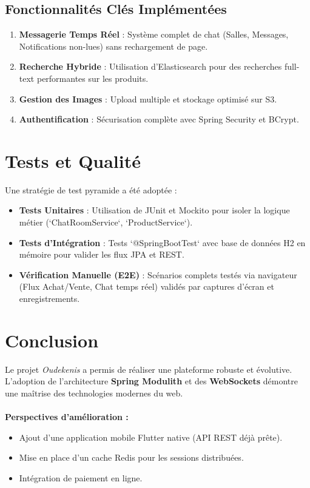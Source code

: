 \documentclass[12pt,a4paper]{article}
\begin{document}
\subsection{Fonctionnalités Clés Implémentées}
\begin{enumerate}
    \item \textbf{Messagerie Temps Réel} : Système complet de chat (Salles, Messages, Notifications non-lues) sans rechargement de page.
    \item \textbf{Recherche Hybride} : Utilisation d'Elasticsearch pour des recherches full-text performantes sur les produits.
    \item \textbf{Gestion des Images} : Upload multiple et stockage optimisé sur S3.
    \item \textbf{Authentification} : Sécurisation complète avec Spring Security et BCrypt.
\end{enumerate}

\section{Tests et Qualité}
Une stratégie de test pyramide a été adoptée :
\begin{itemize}
    \item \textbf{Tests Unitaires} : Utilisation de JUnit et Mockito pour isoler la logique métier (`ChatRoomService`, `ProductService`).
    \item \textbf{Tests d'Intégration} : Tests `@SpringBootTest` avec base de données H2 en mémoire pour valider les flux JPA et REST.
    \item \textbf{Vérification Manuelle (E2E)} : Scénarios complets testés via navigateur (Flux Achat/Vente, Chat temps réel) validés par captures d'écran et enregistrements.
\end{itemize}

\section{Conclusion}
Le projet \textit{Oudekenis} a permis de réaliser une plateforme robuste et évolutive. L'adoption de l'architecture \textbf{Spring Modulith} et des \textbf{WebSockets} démontre une maîtrise des technologies modernes du web.
\\
\\
\textbf{Perspectives d'amélioration :}
\begin{itemize}
    \item Ajout d'une application mobile Flutter native (API REST déjà prête).
    \item Mise en place d'un cache Redis pour les sessions distribuées.
    \item Intégration de paiement en ligne.
\end{itemize}
\end{document}
